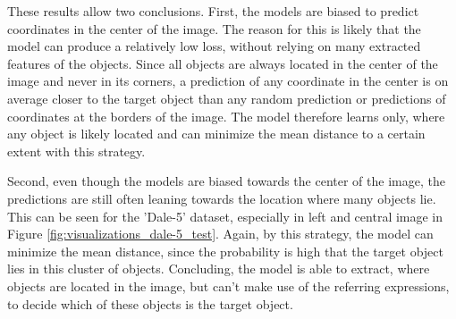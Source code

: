 These results allow two conclusions.
First, the models are biased to predict coordinates in the center of the image.
The reason for this is likely that the model can produce a relatively low loss, without relying on many extracted features of the objects.
Since all objects are always located in the center of the image and never in its corners, a prediction of any coordinate in the center is on average closer to the target object than any random prediction or predictions of coordinates at the borders of the image.
The model therefore learns only, where any object is likely located and can minimize the mean distance to a certain extent with this strategy.

Second, even though the models are biased towards the center of the image, the predictions are still often leaning towards the location where many objects lie.
This can be seen for the 'Dale-5' dataset, especially in left and central image in Figure \ref{fig:visualizations_dale-5_test}.
Again, by this strategy, the model can minimize the mean distance, since the probability is high that the target object lies in this cluster of objects.
Concluding, the model is able to extract, where objects are located in the image, but can't make use of the referring expressions, to decide which of these objects is the target object.
